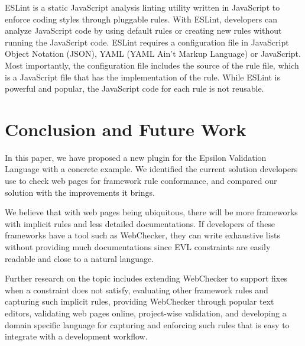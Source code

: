 \documentclass[conference]{IEEETran}
\begin{document}
ESLint \cite{eslint} is a static JavaScript analysis linting utility written in JavaScript to enforce coding styles through pluggable rules. With ESLint, developers can analyze JavaScript code by using default rules or creating new rules without running the JavaScript code. ESLint requires a configuration file in JavaScript Object Notation (JSON), YAML (YAML Ain't Markup Language) or JavaScript. Most importantly, the configuration file includes the source of the rule file, which is a JavaScript file that has the implementation of the rule. While ESLint is powerful and popular, the JavaScript code for each rule is not reusable.    
 


\section{Conclusion and Future Work}

In this paper, we have proposed a new plugin for the Epsilon Validation Language with a concrete example. We identified the current solution developers use to check web pages for framework rule conformance, and compared our solution with the improvements it brings. 

We believe that with web pages being ubiquitous, there will be more frameworks with implicit rules and less detailed documentations. If developers of these frameworks have a tool such as WebChecker, they can write exhaustive lists without providing much documentations since EVL constraints are easily readable and close to a natural language. 

Further research on the topic includes extending WebChecker to support fixes when a constraint does not satisfy, evaluating other framework rules and capturing such implicit rules, providing WebChecker through popular text editors, validating web pages online, project-wise validation, and developing a domain specific language for capturing and enforcing such rules that is easy to integrate with a development workflow.


 
\end{document}
